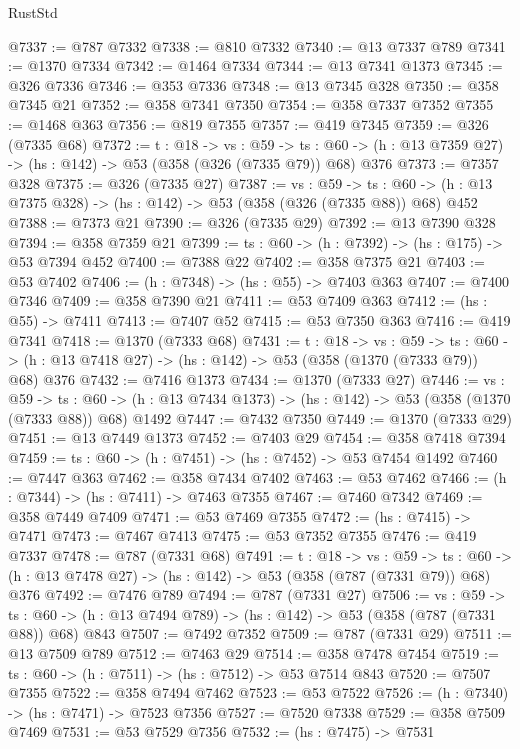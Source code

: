 \begin{lexlean}{RustStd}
\begin{coremodule}
@7337 := @787 @7332
@7338 := @810 @7332
@7340 := @13 @7337 @789
@7341 := @1370 @7334
@7342 := @1464 @7334
@7344 := @13 @7341 @1373
@7345 := @326 @7336
@7346 := @353 @7336
@7348 := @13 @7345 @328
@7350 := @358 @7345 @21
@7352 := @358 @7341 @7350
@7354 := @358 @7337 @7352
@7355 := @1468 @363
@7356 := @819 @7355
@7357 := @419 @7345
@7359 := @326 (@7335 @68)
@7372 := {t : @18} ->
  {vs : @59} ->
  {ts : @60} -> (h : @13 @7359 @27) -> (hs : @142) -> @53 (@358 (@326 (@7335 @79)) @68) @376
@7373 := @7357 @328
@7375 := @326 (@7335 @27)
@7387 := {vs : @59} ->
  {ts : @60} -> (h : @13 @7375 @328) -> (hs : @142) -> @53 (@358 (@326 (@7335 @88)) @68) @452
@7388 := @7373 @21
@7390 := @326 (@7335 @29)
@7392 := @13 @7390 @328
@7394 := @358 @7359 @21
@7399 := {ts : @60} -> (h : @7392) -> (hs : @175) -> @53 @7394 @452
@7400 := @7388 @22
@7402 := @358 @7375 @21
@7403 := @53 @7402
@7406 := (h : @7348) -> (hs : @55) -> @7403 @363
@7407 := @7400 @7346
@7409 := @358 @7390 @21
@7411 := @53 @7409 @363
@7412 := (hs : @55) -> @7411
@7413 := @7407 @52
@7415 := @53 @7350 @363
@7416 := @419 @7341
@7418 := @1370 (@7333 @68)
@7431 := {t : @18} ->
  {vs : @59} ->
  {ts : @60} -> (h : @13 @7418 @27) -> (hs : @142) -> @53 (@358 (@1370 (@7333 @79)) @68) @376
@7432 := @7416 @1373
@7434 := @1370 (@7333 @27)
@7446 := {vs : @59} ->
  {ts : @60} -> (h : @13 @7434 @1373) -> (hs : @142) -> @53 (@358 (@1370 (@7333 @88)) @68) @1492
@7447 := @7432 @7350
@7449 := @1370 (@7333 @29)
@7451 := @13 @7449 @1373
@7452 := @7403 @29
@7454 := @358 @7418 @7394
@7459 := {ts : @60} -> (h : @7451) -> (hs : @7452) -> @53 @7454 @1492
@7460 := @7447 @363
@7462 := @358 @7434 @7402
@7463 := @53 @7462
@7466 := (h : @7344) -> (hs : @7411) -> @7463 @7355
@7467 := @7460 @7342
@7469 := @358 @7449 @7409
@7471 := @53 @7469 @7355
@7472 := (hs : @7415) -> @7471
@7473 := @7467 @7413
@7475 := @53 @7352 @7355
@7476 := @419 @7337
@7478 := @787 (@7331 @68)
@7491 := {t : @18} ->
  {vs : @59} ->
  {ts : @60} -> (h : @13 @7478 @27) -> (hs : @142) -> @53 (@358 (@787 (@7331 @79)) @68) @376
@7492 := @7476 @789
@7494 := @787 (@7331 @27)
@7506 := {vs : @59} ->
  {ts : @60} -> (h : @13 @7494 @789) -> (hs : @142) -> @53 (@358 (@787 (@7331 @88)) @68) @843
@7507 := @7492 @7352
@7509 := @787 (@7331 @29)
@7511 := @13 @7509 @789
@7512 := @7463 @29
@7514 := @358 @7478 @7454
@7519 := {ts : @60} -> (h : @7511) -> (hs : @7512) -> @53 @7514 @843
@7520 := @7507 @7355
@7522 := @358 @7494 @7462
@7523 := @53 @7522
@7526 := (h : @7340) -> (hs : @7471) -> @7523 @7356
@7527 := @7520 @7338
@7529 := @358 @7509 @7469
@7531 := @53 @7529 @7356
@7532 := (hs : @7475) -> @7531

\end{coremodule}
\end{lexlean}
